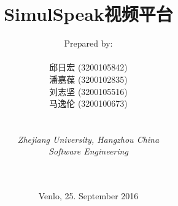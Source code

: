 
\def\Company{Consultancy}
\def\Institute{\textit{Zhejiang University, Hangzhou China}}
\def\Course{\textit{Software Engineering}}
\def\Module{\textit{ }}
\def\Docent{\textit{}}
\def\Assistant{\textit{}}

\def\BoldTitle{SimulSpeak视频平台}

\def\Authors{Prepared by:\\\\ 邱日宏 (3200105842) \\ 潘嘉葆 (3200102835) \\ 刘志坚 (3200105516) \\ 马逸伦 (3200100673) } 


\title{\textbf{\BoldTitle}\\\Subtitle}
\author{\Authors \\ \\ \\ \Institute\\ \Course\\ \Module\\ \Docent\\ \Assistant}
\date{Venlo, 25. September 2016}


